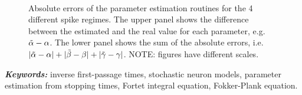 \documentclass[a4paper,11pt]{article}
\begin{document}
\begin{figure}[h!]
\begin{center}
\\
\caption{Absolute errors of the parameter estimation routines for the 4
different spike regimes. The upper panel shows the difference
between the estimated and the real value for each parameter, e.g. $\tilde{{\alpha}} -
{\alpha}$. The lower panel shows the sum of the absolute errors, i.e.\ $|\tilde{{\alpha}} - {\alpha}|+|\tilde{{\beta}}
- {\beta}| +|\tilde{{\gamma }} - {\gamma }|$.
NOTE: figures have different scales.}
\label{fig:comprehensive_tests}
\end{center}
\end{figure}

\medskip\noindent\textbf{\textit{Keywords:}}
inverse first-passage times, stochastic neuron models, parameter estimation from
stopping times, Fortet integral equation, Fokker-Plank equation.



\end{document}
